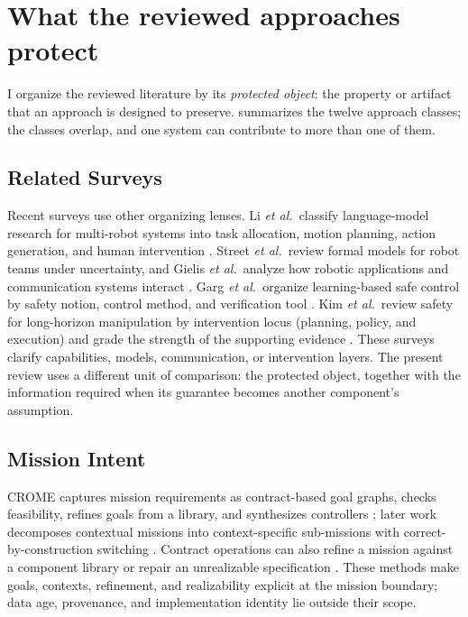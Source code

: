 \section{What the reviewed approaches protect}
\label{sec:taxonomy}

I organize the reviewed literature by its \emph{protected object}: the
property or artifact that an approach is designed to preserve.
 summarizes the twelve approach classes; the classes overlap,
and one system can contribute to more than one of them.



\subsection{Related Surveys}

Recent surveys use other organizing lenses.  Li \emph{et al.}\ classify
language-model research for multi-robot systems into task allocation, motion
planning, action generation, and human intervention \cite{li2026llmmrs}.
Street \emph{et al.}\ review formal models for robot teams under uncertainty,
and Gielis \emph{et al.}\ analyze how robotic applications and communication
systems interact \cite{street2023formal,gielis2022communications}.  Garg
\emph{et al.}\ organize learning-based safe control by safety notion, control
method, and verification tool \cite{garg2024safecontrol}.  Kim \emph{et al.}\
review safety for long-horizon manipulation by intervention locus (planning,
policy, and execution) and grade the strength of the supporting evidence
\cite{kim2026safeembodied}.  These surveys clarify capabilities, models,
communication, or intervention layers.  The present review uses a different
unit of comparison: the protected object, together with the information required
when its guarantee becomes another component's assumption.

\subsection{Mission Intent}

CROME captures mission requirements as contract-based goal graphs, checks
feasibility, refines goals from a library, and synthesizes controllers
\cite{mallozzi2020crome}; later work decomposes contextual missions into
context-specific sub-missions with correct-by-construction switching
\cite{mallozzi2023contextual}.  Contract operations can also refine a mission
against a component library or repair an unrealizable specification
\cite{mallozzi2023repair}.  These methods make goals, contexts, refinement, and
realizability explicit at the mission boundary; data age, provenance, and
implementation identity lie outside their scope.

